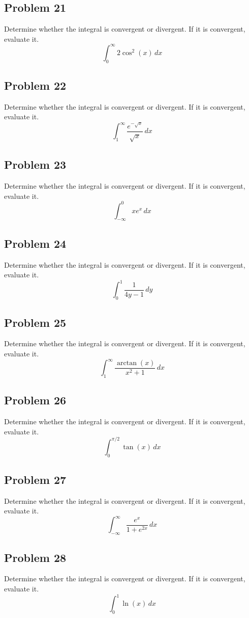 \documentclass{article}
\begin{document}
\subsection*{Problem 21}
Determine whether the integral is convergent or divergent. If it is convergent, evaluate it.
\[ \int_{0}^{\infty} 2\cos^2(x) \,dx \]

\subsection*{Problem 22}
Determine whether the integral is convergent or divergent. If it is convergent, evaluate it.
\[ \int_{1}^{\infty} \frac{e^{-\sqrt{x}}}{\sqrt{x}} \,dx \]

\subsection*{Problem 23}
Determine whether the integral is convergent or divergent. If it is convergent, evaluate it.
\[ \int_{-\infty}^{0} xe^x \,dx \]

\subsection*{Problem 24}
Determine whether the integral is convergent or divergent. If it is convergent, evaluate it.
\[ \int_{0}^{1} \frac{1}{4y-1} \,dy \]

\subsection*{Problem 25}
Determine whether the integral is convergent or divergent. If it is convergent, evaluate it.
\[ \int_{1}^{\infty} \frac{\arctan(x)}{x^2+1} \,dx \]

\subsection*{Problem 26}
Determine whether the integral is convergent or divergent. If it is convergent, evaluate it.
\[ \int_{0}^{\pi/2} \tan(x) \,dx \]

\subsection*{Problem 27}
Determine whether the integral is convergent or divergent. If it is convergent, evaluate it.
\[ \int_{-\infty}^{\infty} \frac{e^x}{1+e^{2x}} \,dx \]

\subsection*{Problem 28}
Determine whether the integral is convergent or divergent. If it is convergent, evaluate it.
\[ \int_{0}^{1} \ln(x) \,dx \]
\end{document}
